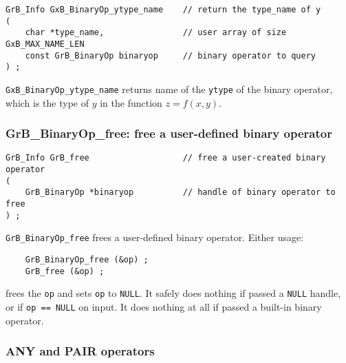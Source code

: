 \documentclass[12pt]{article}
\begin{document}
\begin{mdframed}[userdefinedwidth=6in]
{\footnotesize
\begin{verbatim}
GrB_Info GxB_BinaryOp_ytype_name    // return the type_name of y
(
    char *type_name,                // user array of size GxB_MAX_NAME_LEN
    const GrB_BinaryOp binaryop     // binary operator to query
) ;
\end{verbatim}
} \end{mdframed}

\verb'GxB_BinaryOp_ytype_name'
returns name of the \verb'ytype' of the binary operator, which is the
type of $y$ in the function $z=f(x,y)$.

\subsubsection{{\sf GrB\_BinaryOp\_free:} free a user-defined binary operator}
\label{binaryop_free}

\begin{mdframed}[userdefinedwidth=6in]
{\footnotesize
\begin{verbatim}
GrB_Info GrB_free                   // free a user-created binary operator
(
    GrB_BinaryOp *binaryop          // handle of binary operator to free
) ;
\end{verbatim}
} \end{mdframed}

\verb'GrB_BinaryOp_free' frees a user-defined binary operator.
Either usage:

    {\small
    \begin{verbatim}
    GrB_BinaryOp_free (&op) ;
    GrB_free (&op) ; \end{verbatim}}

\noindent
frees the \verb'op' and sets \verb'op' to \verb'NULL'.
It safely does nothing if passed a \verb'NULL'
handle, or if \verb'op == NULL' on input.
It does nothing at all if passed a built-in binary operator.

\subsubsection{{\sf ANY} and {\sf PAIR} operators}
\label{any_pair}
\end{document}
